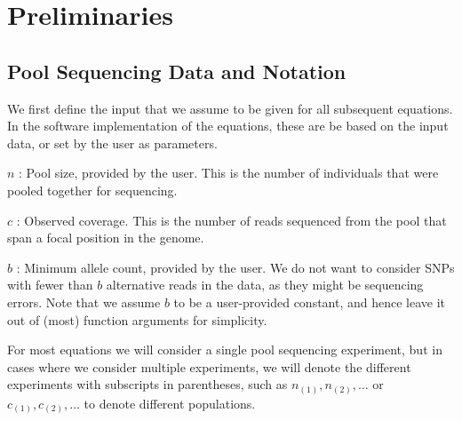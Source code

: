 \documentclass[a4paper,fontsize=9pt,DIV=14]{scrartcl}
\newcounter{todo}
\newcommand\todo[1]{}
\newcommand{\samplesize}{n}
\newcommand{\coverage}{c}
\newcommand\citeay[1]{\citeauthor{#1} (\citeyear{#1}) \cite{#1}}
\begin{document}
\section{Preliminaries}
\label{supp:sec:Definitions}



\subsection{Pool Sequencing Data and Notation}
\label{supp:sec:Definitions:sub:PoolSequencing}

We first define the input that we assume to be given for all subsequent equations.
In the software implementation of the equations, these are be based on the input data, or set by the user as parameters.

$\samplesize$ :
Pool size, provided by the user. This is the number of individuals that were pooled together for sequencing.

$\coverage$ :
Observed coverage. This is the number of reads sequenced from the pool that span a focal position in the genome. \todo{this being a sum of Cs, isn't that also a random variable, and should be captialized?  Yes and no -- throughout we assume that it is not random, which is fine -- the randomness in the coverage is ancillary (\url{https://en.wikipedia.org/wiki/Ancillary_statistic}) to the estimation of the frequencies, and so in some sense it's uninteresting / unimportant whether it's random or not.}

$b$ :
Minimum allele count, provided by the user.
We do not want to consider SNPs with fewer than $b$ alternative reads in the data, as they might be sequencing errors.
Note that we assume $b$ to be a user-provided constant,
and hence leave it out of (most) function arguments for simplicity.

For most equations we will consider a single pool sequencing experiment, but in cases where we consider multiple experiments, we will denote the different experiments with subscripts in parentheses, such as $\samplesize_{(1)}, \samplesize_{(2)},\ldots$ or $\coverage_{(1)}, \coverage_{(2)}, \ldots$ to denote different populations.
\end{document}
